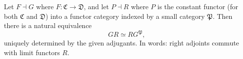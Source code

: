 Let $F \dashv G$ where $F : \mathfrak{C} \to \mathfrak{D}$, and let $P \dashv R$ where $P$ is the constant functor (for both $\mathfrak{C}$ and $\mathfrak{D}$) into a functor category indexed by a small category $\mathfrak{P}$. Then there is a natural equivalence
$$
GR \simeq R G^{\mathfrak{P}},
$$
uniquely determined by the given adjugants. In words: right adjoints commute with limit functors $R$.
